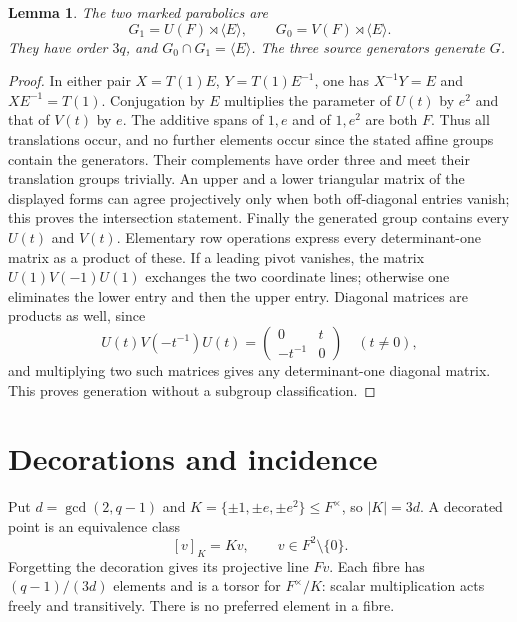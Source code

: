 \documentclass[11pt,a4paper]{article}
\newtheorem{lemma}[theorem]{Lemma}
\newcommand{\gen}[1]{\langle #1\rangle}
\begin{document}
\begin{lemma}\label{groups}
The two marked parabolics are
\[
 G_1=U(F)\rtimes\gen E,\qquad G_0=V(F)\rtimes\gen E.
\]
They have order $3q$, and $G_0\cap G_1=\gen E$.
The three source generators generate $G$.
\end{lemma}
\begin{proof}
In either pair $X=T(1)E$, $Y=T(1)E^{-1}$, one has
$X^{-1}Y=E$ and $XE^{-1}=T(1)$. Conjugation by $E$ multiplies
the parameter of $U(t)$ by $e^2$ and that of $V(t)$ by $e$.
The additive spans of $1,e$ and of $1,e^2$ are both $F$.
Thus all translations occur, and no further elements occur since
the stated affine groups contain the generators. Their complements
have order three and meet their translation groups trivially.
An upper and a lower triangular matrix of the displayed forms can
agree projectively only when both off-diagonal entries vanish;
this proves the intersection statement.
Finally the generated group contains every $U(t)$ and $V(t)$.
Elementary row operations express every determinant-one matrix as
a product of these. If a leading pivot vanishes, the matrix
$U(1)V(-1)U(1)$ exchanges the two coordinate lines; otherwise
one eliminates the lower entry and then the upper entry.
Diagonal matrices are products as well, since
\[
 U(t)V(-t^{-1})U(t)
   =\begin{pmatrix}0&t\\-t^{-1}&0\end{pmatrix}\quad(t\ne0),
\]
and multiplying two such matrices gives any determinant-one diagonal
matrix. This proves generation without a subgroup classification.
\end{proof}

\section{Decorations and incidence}

Put $d=\gcd(2,q-1)$ and
$K=\{\pm1,\pm e,\pm e^2\}\le F^\times$, so $|K|=3d$.
A decorated point is an equivalence class
\[
             [v]_K=Kv,\qquad v\in F^2\setminus\{0\}.
\]
Forgetting the decoration gives its projective line $Fv$.
Each fibre has $(q-1)/(3d)$ elements and is a torsor for
$F^\times/K$: scalar multiplication acts freely and transitively.
There is no preferred element in a fibre.
\end{document}
